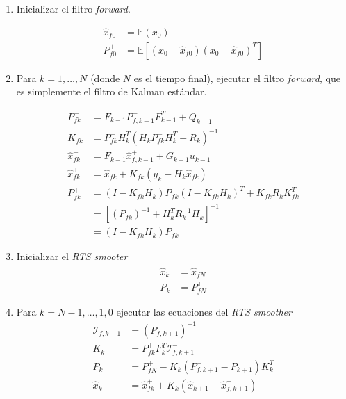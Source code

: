 \begin{enumerate}
    \item Inicializar el filtro \textit{forward}.
    
    \[
    \begin{aligned}
    \hat{x}_{f0} &= \mathbb{E}(x_0) \\
    P^{+}_{f0} &= \mathbb{E}\left[(x_0 - \hat{x}_{f0})(x_0 - \hat{x}_{f0})^{T}\right] 
    \end{aligned}
    \]
    
    \item Para \(k = 1, \dots, N\) (donde \(N\) es el tiempo final), ejecutar el filtro \textit{forward}, que es simplemente el filtro de Kalman estándar. 
    
    \[
    \begin{aligned}
    P^{-}_{fk} &= F_{k-1}P^{+}_{f,k-1}F_{k-1}^{T} + Q_{k-1} \\ 
    K_{fk} &= P^{-}_{fk} H_k^{T} (H_k P^{-}_{fk}H_k^{T} + R_k)^{-1}  \\
    \hat{x}^{-}_{fk} &= F_{k-1}\hat{x}^{+}_{f,k-1} + G_{k-1}u_{k-1} \\
    \hat{x}^{+}_{fk} &= \hat{x}^{-}_{fk} + K_{fk} \left(y_k - H_k \hat{x}^{-}_{fk} \right)\\ 
    P^{+}_{fk} &= (I - K_{fk}H_k) P^{-}_{fk} (I-K_{fk}H_k)^{T} + K_{fk}R_{k}K_{fk}^{T} \\
    &= \left[ (P^{-}_{fk})^{-1} + H_k^{T} R_{k}^{-1}H_k\right]^{-1} \\ 
    &= (I - K_{fk}H_k)P^{-}_{fk}
    \end{aligned}
    \]
    
    \item Inicializar el \textit{RTS smooter} 
    \[
    \begin{aligned}
    \hat{x}_{k} &= \hat{x}^{+}_{fN} \\
    P_k &= P^{+}_{fN}
    \end{aligned}
    \]
    \item Para \(k = N-1, \dots, 1, 0\) ejecutar las ecuaciones del \textit{RTS smoother} 
    \[
    \begin{aligned}
    \mathcal{I}^{-}_{f, k+1} &= \left( P^{-}_{f, k+1}\right)^{-1} \\
    K_k &= P^{+}_{fk} F_{k}^{T} \mathcal{I}^{-}_{f, k+1} \\
    P_k &= P^{+}_{fN} - K_k (P^{-}_{f, k+1} - P_{k+1})K_k^{T} \\ 
    \hat{x}_k &= \hat{x}^{+}_{fk} + K_k(\hat{x}_{k+1} - \hat{x}^{-}_{f,k+1})
    \end{aligned}
    \]
\end{enumerate}



